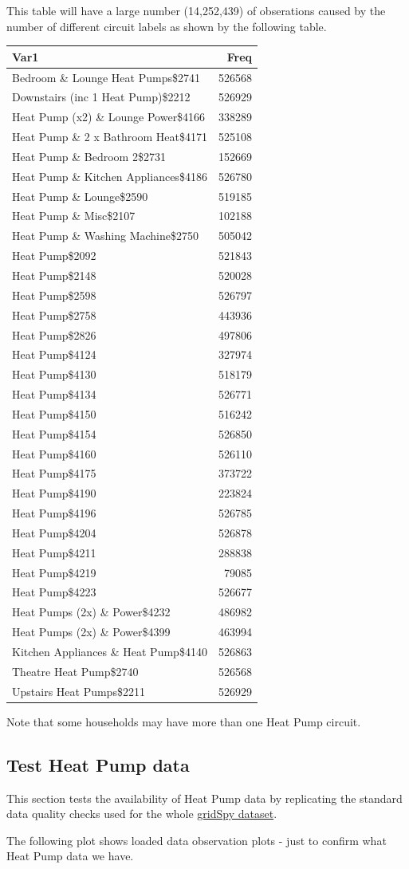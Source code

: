 \documentclass[]{article}
\begin{document}
This table will have a large number (14,252,439) of obserations caused
by the number of different circuit labels as shown by the following
table.

\begin{longtable}[]{@{}lr@{}}
\toprule
Var1 & Freq\tabularnewline
\midrule
\endhead
Bedroom \& Lounge Heat Pumps\$2741 & 526568\tabularnewline
Downstairs (inc 1 Heat Pump)\$2212 & 526929\tabularnewline
Heat Pump (x2) \& Lounge Power\$4166 & 338289\tabularnewline
Heat Pump \& 2 x Bathroom Heat\$4171 & 525108\tabularnewline
Heat Pump \& Bedroom 2\$2731 & 152669\tabularnewline
Heat Pump \& Kitchen Appliances\$4186 & 526780\tabularnewline
Heat Pump \& Lounge\$2590 & 519185\tabularnewline
Heat Pump \& Misc\$2107 & 102188\tabularnewline
Heat Pump \& Washing Machine\$2750 & 505042\tabularnewline
Heat Pump\$2092 & 521843\tabularnewline
Heat Pump\$2148 & 520028\tabularnewline
Heat Pump\$2598 & 526797\tabularnewline
Heat Pump\$2758 & 443936\tabularnewline
Heat Pump\$2826 & 497806\tabularnewline
Heat Pump\$4124 & 327974\tabularnewline
Heat Pump\$4130 & 518179\tabularnewline
Heat Pump\$4134 & 526771\tabularnewline
Heat Pump\$4150 & 516242\tabularnewline
Heat Pump\$4154 & 526850\tabularnewline
Heat Pump\$4160 & 526110\tabularnewline
Heat Pump\$4175 & 373722\tabularnewline
Heat Pump\$4190 & 223824\tabularnewline
Heat Pump\$4196 & 526785\tabularnewline
Heat Pump\$4204 & 526878\tabularnewline
Heat Pump\$4211 & 288838\tabularnewline
Heat Pump\$4219 & 79085\tabularnewline
Heat Pump\$4223 & 526677\tabularnewline
Heat Pumps (2x) \& Power\$4232 & 486982\tabularnewline
Heat Pumps (2x) \& Power\$4399 & 463994\tabularnewline
Kitchen Appliances \& Heat Pump\$4140 & 526863\tabularnewline
Theatre Heat Pump\$2740 & 526568\tabularnewline
Upstairs Heat Pumps\$2211 & 526929\tabularnewline
\bottomrule
\end{longtable}

Note that some households may have more than one Heat Pump circuit.

\subsection{Test Heat Pump data}\label{test-heat-pump-data}

This section tests the availability of Heat Pump data by replicating the
standard data quality checks used for the whole
\href{https://git.soton.ac.uk/ba1e12/nzGREENGrid/tree/master/dataProcessing/gridSpy}{gridSpy
dataset}.

The following plot shows loaded data observation plots - just to confirm
what Heat Pump data we have.
\end{document}

